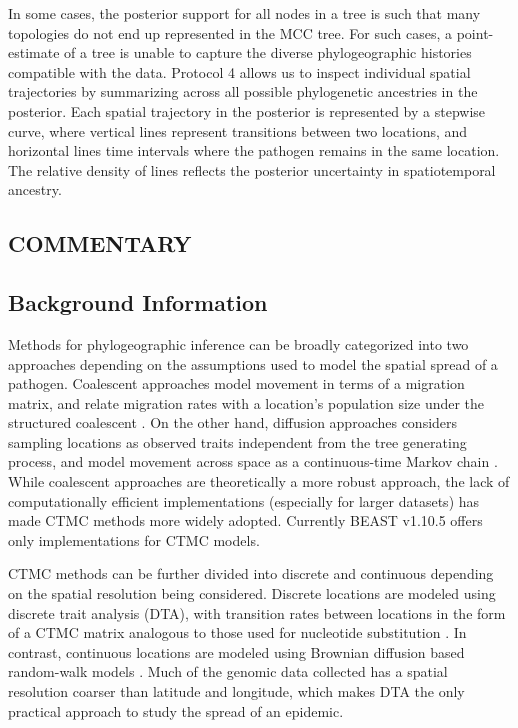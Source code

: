 \documentclass{article}
\begin{document}
In some cases, the posterior support for all nodes in a tree is such that many topologies do not end up represented in the MCC tree. For such cases, a point-estimate of a tree is unable to capture the diverse phylogeographic histories compatible with the data. Protocol 4 allows us to inspect individual spatial trajectories by summarizing across all possible phylogenetic ancestries in the posterior. Each spatial trajectory in the posterior is represented by a stepwise curve, where vertical lines represent transitions between two locations, and horizontal lines time intervals where the pathogen remains in the same location. The relative density of lines reflects the posterior uncertainty in spatiotemporal ancestry. 

\begin{multicols}{2}

\section*{COMMENTARY}
\subsection*{Background Information}

Methods for phylogeographic inference can be broadly categorized into two approaches depending on the assumptions used to model the spatial spread of a pathogen. Coalescent approaches model movement in terms of a migration matrix, and relate migration rates with a location's population size under the structured coalescent \cite{basta,mascot}. On the other hand, diffusion approaches considers sampling locations as observed traits independent from the tree generating process, and model movement across space as a continuous-time Markov chain \cite{dta,rw}.  While coalescent approaches are theoretically a more robust approach, the lack of computationally efficient implementations (especially for larger datasets) has made CTMC methods more widely adopted. Currently BEAST v1.10.5 offers only implementations for CTMC models.

CTMC methods can be further divided into discrete and continuous depending on the spatial resolution being considered. Discrete locations are modeled using discrete trait analysis (DTA), with transition rates between locations in the form of a CTMC matrix analogous to those used for nucleotide substitution \cite{dta}. In contrast, continuous locations are modeled using Brownian diffusion based random-walk models \cite{rw}. Much of the genomic data collected has a spatial resolution coarser than latitude and longitude, which makes DTA the only practical approach to study the spread of an epidemic. 


\end{multicols}
\end{document}
